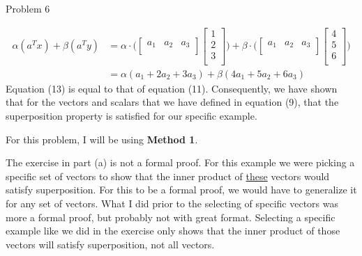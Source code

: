 \begin{problem}{Problem 6}
\begin{Highlight}
        \normalsize
        \begin{align}
            \alpha(a^{T}x) + \beta(a^{T}y) & = \alpha \cdot
            \Bigg(
            \begin{bmatrix}
                a_{1} & a_{2} & a_{3} \\
            \end{bmatrix}
            \begin{bmatrix}
                1 \\
                2 \\
                3 \\
            \end{bmatrix}
            \Bigg) + \beta \cdot
            \Bigg(
            \begin{bmatrix}
                a_{1} & a_{2} & a_{3} \\
            \end{bmatrix}
            \begin{bmatrix}
                4 \\
                5 \\
                6 \\
            \end{bmatrix}
            \Bigg) \\
            & = \alpha(a_{1} + 2a_{2} + 3a_{3}) + \beta(4a_{1} + 5a_{2} + 6a_{3})
        \end{align}
        Equation (13) is equal to that of equation (11). Consequently, we have shown that for the vectors and scalars that we have defined in equation (9), that the superposition property is satisfied 
        for our specific example. 
    \end{Highlight}

    \begin{Highlight}
        For this problem, I will be using \textbf{Method 1}. \vspace*{1em}

        The exercise in part (a) is not a formal proof. For this example we were picking a specific set of vectors to show that the inner product of \underline{these} vectors would satisfy superposition.
        For this to be a formal proof, we would have to generalize it for any set of vectors. What I did prior to the selecting of specific vectors was more a formal proof, but probably not with great 
        format. Selecting a specific example like we did in the exercise only shows that the inner product of those vectors will satisfy superposition, not all vectors.
    \end{Highlight}


\end{problem}

